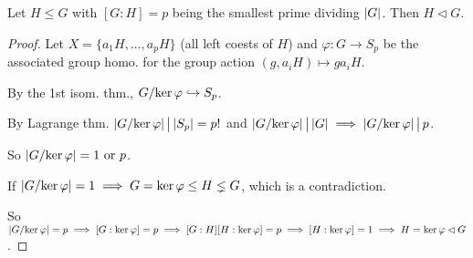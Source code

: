 \begin{prop}
  Let $H \le G$ with $[G:H] = p$ being the smallest prime dividing $\abs{G}$.
  Then $H \lhd G$.
  \begin{proof}
    Let $X = \{ a_1H, \dots, a_pH \}$ (all left coests of $H$) and
    $\varphi: G \to S_p$ be the associated group homo. for the group action
    $(g, a_iH) \mapsto ga_iH$.

    By the 1st isom. thm., $\quot{G}{\ker\varphi} \toone S_p$.

    By Lagrange thm. $\abs*{\quot{G}{\ker\varphi}} \Div \abs{S_p} = p!$ and
    $\abs*{\quot{G}{\ker\varphi}} \Div \abs{G} \implies
    \abs*{\quot{G}{\ker\varphi}} \Div p$.

    So $\abs*{\quot{G}{\ker\varphi}} = 1 \text{~or~} p$.

    If $\abs*{\quot{G}{\ker\varphi}} = 1 \implies G = \ker\varphi \le H \lneq G$,
    which is a contradiction.

    So $\abs*{\quot{G}{\ker\varphi}} = p \implies [G:\ker\varphi] = p
    \implies [G:H][H:\ker\varphi] = p \implies [H:\ker\varphi] = 1
    \implies H = \ker\varphi \lhd G$.
  \end{proof}
\end{prop}


